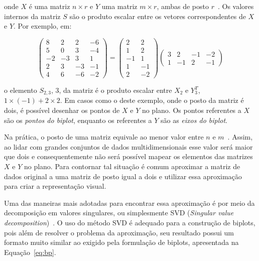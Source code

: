 onde $X$ é uma matriz $n \times r$ e $Y$ uma matriz $m
\times r$, ambas de posto $r$~\cite{Gabriel1971}. Os valores
internos da matriz $S$ são o produto escalar entre os
vetores correspondentes de $X$ e $Y$. Por exemplo, em:

\begin{equation}
    \left( \begin{array}{rrrr}
        8 &  2 &  2 & -6 \\
        5 &  0 &  3 & -4 \\
       -2 & -3 &  3 &  1 \\
            2 &  3 & -3 & -1 \\
        4 &  6 & -6 & -2\end{array}
\right) = \left( \begin{array}{rr}
         2 & 2 \\
         1 & 2 \\
        -1 & 1 \\
         1 & -1 \\
         2 & -2\end{array} 
\right) \left( \begin{array}{rrrr}
        3 &  2 &-1 & -2 \\
    1 & -1 & 2 & -1 \end{array} 
\right)
\end{equation}

o elemento $S_{2,3}$, 3, da matriz é o
produto escalar entre $X_2$ e $Y^T_3$, $1 \times \left( -1
\right) + 2 \times 2$. Em casos como o deste
exemplo, onde o posto da matriz é dois, é possível desenhar os
pontos de $X$ e $Y$ no plano. Os pontos referentes a $X$ são
os \emph{pontos do biplot}, enquanto os referentes a $Y$ são
as \emph{eixos do biplot}.

Na prática, o posto de uma matriz equivale ao menor valor
entre $n$ e $m$~\cite{Greenacre2010}. Assim, ao lidar com
grandes conjuntos de dados multidimensionais esse valor será
maior que dois e consequentemente não será possível mapear
os elementos das matrizes $X$ e $Y$ no plano. Para contornar
tal situação é comum aproximar a matriz de dados original a
uma matriz de posto igual a dois e utilizar essa aproximação
para criar a representação visual.

Uma das maneiras mais adotadas para encontrar essa
aproximação é por meio da decomposição em valores
singulares, ou simplesmente SVD (\emph{Singular value
decomposition})~\cite{Kalman1996}. O uso do método SVD é
adequado para a construção de biplots, pois além de
resolver o problema da aproximação, seu resultado possui
um formato muito similar ao exigido pela formulação de biplots,
apresentada na Equação~\ref{eq:bp}.

